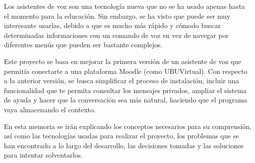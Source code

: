 
Los asistentes de voz son una tecnología nueva que no se ha usado apenas hasta el momento para la educación. Sin embargo, se ha visto que puede ser muy interesante usarlas, debido a que es mucho más rápido y cómodo buscar determinadas informaciones con un comando de voz en vez de navegar por diferentes menús que pueden ser bastante complejos.

Este proyecto se basa en mejorar la primera versión de un asistente de voz que permitía conectarte a una plataforma Moodle (como UBUVirtual). Con respecto a la anterior versión, se busca simplificar el proceso de instalación, incluir una funcionalidad que te permita consultar los mensajes privados, ampliar el sistema de ayuda y hacer que la conversación sea más natural, haciendo que el programa vaya almacenando el contexto.

En esta memoria se irán explicando los conceptos necesarios para su comprensión, así como las tecnologías usadas para realizar el proyecto, los problemas que se han encontrado a lo largo del desarrollo, las decisiones tomadas y las soluciones para intentar solventarlos.
